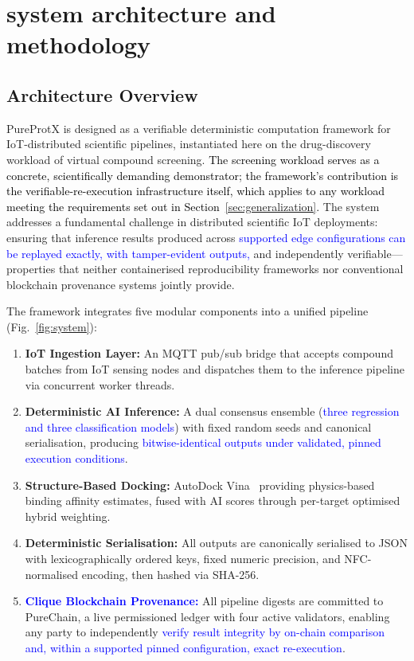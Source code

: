 \documentclass[conference]{IEEEtran}
\newcommand{\rev}[2]{\textcolor{blue}{#2}}
\begin{document}
\section{\textbf{system architecture and methodology}}
\label{sec:methods}


\subsection{\textbf{Architecture Overview}}
\label{sec:arch}

PureProtX is designed as a verifiable deterministic computation
framework for IoT-distributed scientific pipelines, instantiated here
on the drug-discovery workload of virtual compound screening.
\textcolor{black}{The screening workload serves as a concrete,
scientifically demanding demonstrator; the framework's
contribution is the verifiable-re-execution infrastructure
itself, which applies to any workload meeting the
requirements set out in Section~\ref{sec:generalization}.}
The system addresses a fundamental challenge in distributed scientific
IoT deployments: ensuring that inference results produced across
\rev{R1.1}{supported edge configurations can be replayed exactly, with tamper-evident outputs,}
and independently verifiable---properties that neither containerised
reproducibility frameworks nor conventional blockchain provenance
systems jointly provide.

The framework integrates five modular components into a unified
pipeline (Fig.~\ref{fig:system}):

\begin{enumerate}
    \item \textbf{IoT Ingestion Layer:} An MQTT pub/sub bridge that
    accepts compound batches from IoT sensing nodes and dispatches
    them to the inference pipeline via concurrent worker threads.
    \item \textbf{Deterministic AI Inference:} A dual consensus ensemble (\rev{R2.1}{three regression and three classification models}) with
    fixed random seeds and canonical serialisation, producing
    \rev{R1.1}{bitwise-identical outputs under validated, pinned execution conditions}.
    \item \textbf{Structure-Based Docking:} AutoDock Vina~\cite{eberhardt2021autodock}
    providing physics-based binding affinity estimates, fused with
    AI scores through per-target optimised hybrid weighting.
    \item \textbf{Deterministic Serialisation:} All outputs are
    canonically serialised to JSON with lexicographically ordered
    keys, fixed numeric precision, and NFC-normalised encoding,
    then hashed via SHA-256.
    \item \textbf{\rev{R1.2, R2.4}{Clique Blockchain Provenance:}} All pipeline digests
    are committed to PureChain, a live permissioned ledger with
    four active validators, enabling any party to independently
    \rev{R1.1}{verify result integrity by on-chain comparison and, within a supported pinned configuration, exact re-execution}.
\end{enumerate}
\end{document}
